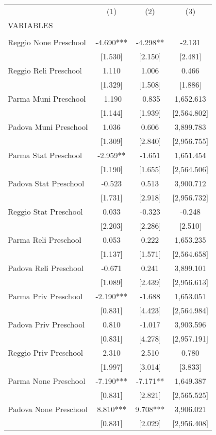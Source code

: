 \begin{tabular}{lccc} \hline
 & (1) & (2) & (3) \\
VARIABLES &  &  &  \\ \hline
 &  &  &  \\
Reggio None Preschool & -4.690*** & -4.298** & -2.131 \\
 & [1.530] & [2.150] & [2.481] \\
Reggio Reli Preschool & 1.110 & 1.006 & 0.466 \\
 & [1.329] & [1.508] & [1.886] \\
Parma Muni Preschool & -1.190 & -0.835 & 1,652.613 \\
 & [1.144] & [1.939] & [2,564.802] \\
Padova Muni Preschool & 1.036 & 0.606 & 3,899.783 \\
 & [1.309] & [2.840] & [2,956.755] \\
Parma Stat Preschool & -2.959** & -1.651 & 1,651.454 \\
 & [1.190] & [1.655] & [2,564.506] \\
Padova Stat Preschool & -0.523 & 0.513 & 3,900.712 \\
 & [1.731] & [2.918] & [2,956.732] \\
Reggio Stat Preschool & 0.033 & -0.323 & -0.248 \\
 & [2.203] & [2.286] & [2.510] \\
Parma Reli Preschool & 0.053 & 0.222 & 1,653.235 \\
 & [1.137] & [1.571] & [2,564.658] \\
Padova Reli Preschool & -0.671 & 0.241 & 3,899.101 \\
 & [1.089] & [2.439] & [2,956.613] \\
Parma Priv Preschool & -2.190*** & -1.688 & 1,653.051 \\
 & [0.831] & [4.423] & [2,564.984] \\
Padova Priv Preschool & 0.810 & -1.017 & 3,903.596 \\
 & [0.831] & [4.278] & [2,957.191] \\
Reggio Priv Preschool & 2.310 & 2.510 & 0.780 \\
 & [1.997] & [3.014] & [3.833] \\
Parma None Preschool & -7.190*** & -7.171** & 1,649.387 \\
 & [0.831] & [2.821] & [2,565.525] \\
Padova None Preschool & 8.810*** & 9.708*** & 3,906.021 \\
 & [0.831] & [2.029] & [2,956.408] \\

\end{tabular}
